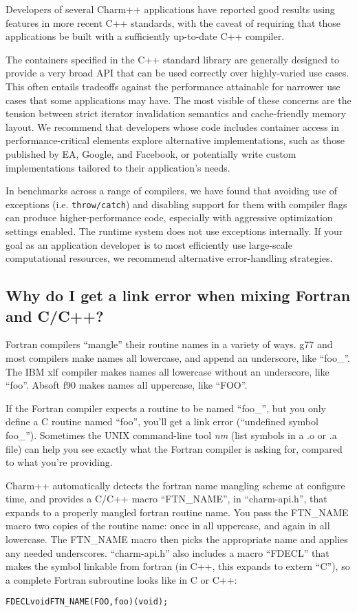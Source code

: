Developers of several Charm++ applications have reported good results
using features in more recent C++ standards, with the caveat of
requiring that those applications be built with a sufficiently
up-to-date C++ compiler.

The containers specified in the C++ standard library are generally
designed to provide a very broad API that can be used correctly over
highly-varied use cases. This often entails tradeoffs against the
performance attainable for narrower use cases that some applications
may have. The most visible of these concerns are the tension between
strict iterator invalidation semantics and cache-friendly memory
layout. We recommend that developers whose code includes container
access in performance-critical elements explore alternative
implementations, such as those published by EA, Google, and Facebook,
or potentially write custom implementations tailored to their
application's needs.

In benchmarks across a range of compilers, we have found that avoiding
use of exceptions (i.e. \verb+throw/catch+) and disabling support for
them with compiler flags can produce higher-performance code,
especially with aggressive optimization settings enabled. The runtime
system does not use exceptions internally. If your goal as an
application developer is to most efficiently use large-scale
computational resources, we recommend alternative error-handling
strategies.

\subsection{Why do I get a link error when mixing Fortran and C/C++?}

\label{f2c}

Fortran compilers ``mangle'' their routine names in a variety
of ways.  g77 and most compilers make names all lowercase, and 
append an underscore, like ``foo\_''.  The IBM xlf compiler makes 
names all lowercase without an underscore, like ``foo''. Absoft f90 
makes names all uppercase, like ``FOO''. 

If the Fortran compiler expects a routine to be named ``foo\_'',
but you only define a C routine named ``foo'', you'll get a link 
error (``undefined symbol foo\_'').  Sometimes the UNIX command-line
tool {\em nm} (list symbols in a .o or .a file) can help you see exactly what the 
Fortran compiler is asking for, compared to what you're providing.

Charm++ automatically detects the fortran name mangling scheme
at configure time, and provides a C/C++ macro ``FTN\_NAME'', in ``charm-api.h'',
that expands to a properly mangled fortran routine name.
You pass the FTN\_NAME macro
two copies of the routine name: once in all uppercase, and again 
in all lowercase.
The FTN\_NAME macro then picks the appropriate name and applies any
needed underscores.  ``charm-api.h'' also includes a macro ``FDECL''
that makes the symbol linkable from fortran (in C++, this expands
to extern ``C''), so a complete Fortran subroutine looks like in C or C++:
\begin{alltt}
FDECL void FTN\_NAME(FOO,foo)(void);
\end{alltt}

